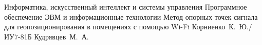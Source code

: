 \documentclass{bmstu}
\begin{document}
\makethesistitle
    {Информатика, искусственный интеллект и системы управления} %
    {Программное обеспечение ЭВМ и информационные технологии} %
    {Метод опорных точек сигнала для геопозиционирования в помещениях с помощью Wi-Fi} %
    {Корниенко~К.~Ю./ИУ7-81Б} %
    {Кудрявцев~М.~А.} %
    {} %
    {} %

\setcounter{page}{5}


\maketableofcontents











\makebibliography


\end{document}
